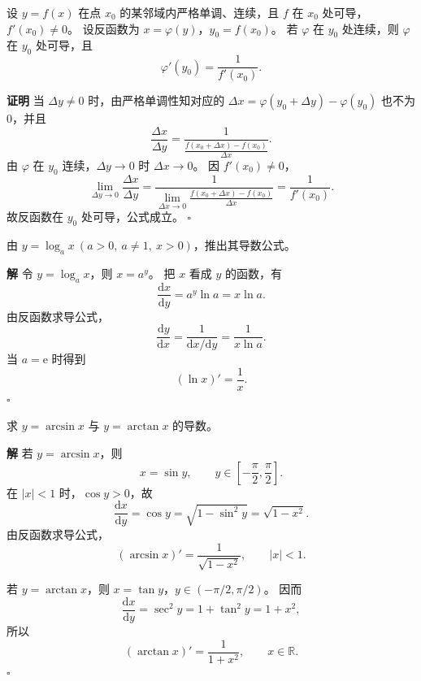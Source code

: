 \documentclass[fontset=fandol]{ctexart}
\newenvironment{proofdetail}{\par\noindent\textbf{证明}\quad}{\hfill$\square$\par\vspace{0.8em}}
\newenvironment{solution}{\par\noindent\textbf{解}\quad}{\hfill$\square$\par\vspace{0.8em}}
\newcommand{\dd}{\mathrm{d}}
\newcommand{\ee}{\mathrm{e}}
\newcommand{\RR}{\mathbb{R}}
\begin{document}
\begin{theorem}[反函数求导公式]
设 $y=f(x)$ 在点 $x_0$ 的某邻域内严格单调、连续，且 $f$ 在 $x_0$ 处可导，$f'(x_0)\neq0$。 设反函数为 $x=\varphi(y)$，$y_0=f(x_0)$。 若 $\varphi$ 在 $y_0$ 处连续，则 $\varphi$ 在 $y_0$ 处可导，且
\[
\varphi'(y_0)=\frac{1}{f'(x_0)}.
\]
\end{theorem}
\begin{proofdetail}
当 $\Delta y\neq0$ 时，由严格单调性知对应的 $\Delta x=\varphi(y_0+\Delta y)-\varphi(y_0)$ 也不为 $0$，并且
\[
\frac{\Delta x}{\Delta y}
=\frac{1}{\frac{f(x_0+\Delta x)-f(x_0)}{\Delta x}}.
\]
由 $\varphi$ 在 $y_0$ 连续，$\Delta y\to0$ 时 $\Delta x\to0$。 因 $f'(x_0)\neq0$，
\[
\lim_{\Delta y\to0}\frac{\Delta x}{\Delta y}
=\frac{1}{\lim_{\Delta x\to0}\frac{f(x_0+\Delta x)-f(x_0)}{\Delta x}}
=\frac1{f'(x_0)}.
\]
故反函数在 $y_0$ 处可导，公式成立。
\end{proofdetail}

\begin{example}[由反函数推出对数函数导数]
由 $y=\log_a x\ (a>0,\ a\neq1,\ x>0)$，推出其导数公式。
\end{example}
\begin{solution}
令 $y=\log_a x$，则 $x=a^y$。 把 $x$ 看成 $y$ 的函数，有
\[
\frac{\dd x}{\dd y}=a^y\ln a=x\ln a.
\]
由反函数求导公式，
\[
\frac{\dd y}{\dd x}
=\frac{1}{\dd x/\dd y}
=\frac{1}{x\ln a}.
\]
当 $a=\ee$ 时得到
\[
(\ln x)'=\frac1x.
\]
\end{solution}

\begin{example}[反三角函数导数]
求 $y=\arcsin x$ 与 $y=\arctan x$ 的导数。
\end{example}
\begin{solution}
若 $y=\arcsin x$，则
\[
x=\sin y,\qquad y\in\left[-\frac{\pi}{2},\frac{\pi}{2}\right].
\]
在 $|x|<1$ 时，$\cos y>0$，故
\[
\frac{\dd x}{\dd y}=\cos y=\sqrt{1-\sin^2y}=\sqrt{1-x^2}.
\]
由反函数求导公式，
\[
(\arcsin x)'=\frac{1}{\sqrt{1-x^2}},\qquad |x|<1.
\]

若 $y=\arctan x$，则 $x=\tan y$，$y\in(-\pi/2,\pi/2)$。 因而
\[
\frac{\dd x}{\dd y}=\sec^2y=1+\tan^2y=1+x^2,
\]
所以
\[
(\arctan x)'=\frac1{1+x^2},\qquad x\in\RR.
\]
\end{solution}
\end{document}
